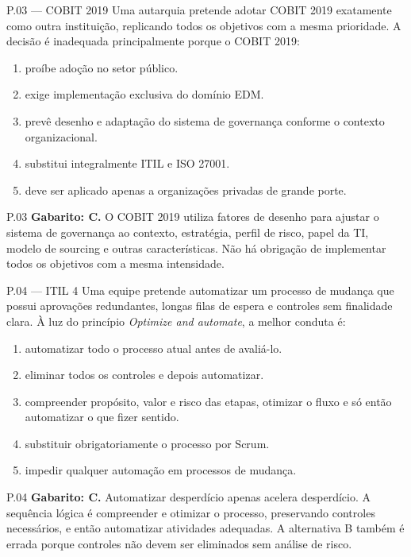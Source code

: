 \begin{questao}{ P.03 — COBIT 2019}
Uma autarquia pretende adotar COBIT 2019 exatamente como outra instituição, replicando todos os objetivos com a mesma prioridade. A decisão é inadequada principalmente porque o COBIT 2019:
\begin{enumerate}[label=\Alph*)]
\item proíbe adoção no setor público.
\item exige implementação exclusiva do domínio EDM.
\item prevê desenho e adaptação do sistema de governança conforme o contexto organizacional.
\item substitui integralmente ITIL e ISO 27001.
\item deve ser aplicado apenas a organizações privadas de grande porte.
\end{enumerate}
\end{questao}
\begin{solucao}{P.03}
\textbf{Gabarito: C.} O COBIT 2019 utiliza fatores de desenho para ajustar o sistema de governança ao contexto, estratégia, perfil de risco, papel da TI, modelo de sourcing e outras características. Não há obrigação de implementar todos os objetivos com a mesma intensidade.
\end{solucao}

\begin{questao}{ P.04 — ITIL 4}
Uma equipe pretende automatizar um processo de mudança que possui aprovações redundantes, longas filas de espera e controles sem finalidade clara. À luz do princípio \textit{Optimize and automate}, a melhor conduta é:
\begin{enumerate}[label=\Alph*)]
\item automatizar todo o processo atual antes de avaliá-lo.
\item eliminar todos os controles e depois automatizar.
\item compreender propósito, valor e risco das etapas, otimizar o fluxo e só então automatizar o que fizer sentido.
\item substituir obrigatoriamente o processo por Scrum.
\item impedir qualquer automação em processos de mudança.
\end{enumerate}
\end{questao}
\begin{solucao}{P.04}
\textbf{Gabarito: C.} Automatizar desperdício apenas acelera desperdício. A sequência lógica é compreender e otimizar o processo, preservando controles necessários, e então automatizar atividades adequadas. A alternativa B também é errada porque controles não devem ser eliminados sem análise de risco.
\end{solucao}

